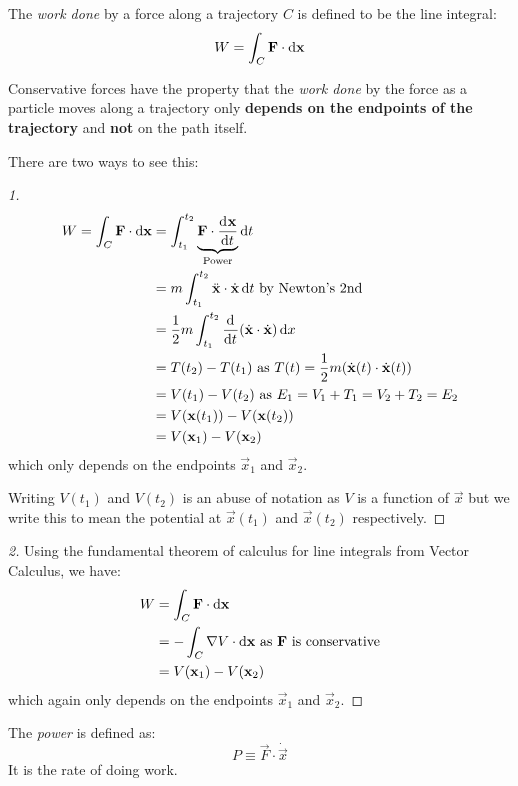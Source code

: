\documentclass[../main.tex]{subfiles}
\begin{document}
\begin{definition}
  The \textit{work done} by a force along a trajectory $C$ is defined to be the line integral:
  \[
    W = \int_C \vec{F} \cdot \d{\vec{x}}
  \]
\end{definition}
\begin{proposition}
  Conservative forces have the property that the \textit{work done} by the force as a particle moves along a trajectory only \textbf{depends on the endpoints of the trajectory} and \textbf{not} on the path itself.
\end{proposition}
There are two ways to see this:
\begin{proof}[1]
  \begin{align*}
    W = \int_C \vec{F} \cdot \d{\vec{x}} &= \int_{t_1}^{t_2} \underbrace{\vec{F} \cdot \deriv{\vec{x}}{t}}_{\text{Power}} \d{t} \\
                                         &= m \int_{t_1}^{t_2} \ddot{\vec{x}} \cdot \dot{\vec{x}} \d{t} \text{ by Newton's 2nd} \\
                                         &= \frac{1}{2}m \int_{t_1}^{t_2} \deriv{}{t}(\dot{\vec{x}} \cdot \dot{\vec{x}}) \d{x} \\
                                         &= T(t_2) - T(t_1) \text{ as $T(t) = \frac{1}{2} m (\dot{\vec{x}}(t) \cdot \dot{\vec{x}}(t))$}\\
                                         &= V(t_1) - V(t_2) \text{ as $E_1 = V_1 + T_1 = V_2 + T_2 = E_2$}\\
                                         &= V(\vec{x}(t_1)) - V(\vec{x}(t_2)) \\
                                         &= V(\vec{x}_1) - V(\vec{x}_2)
  \end{align*}
  which only depends on the endpoints $\vec{x}_1$ and $\vec{x}_2$.

  Writing $V(t_1)$ and $V(t_2)$ is an abuse of notation as $V$ is a function of $\vec{x}$ but we write this to mean the potential at $\vec{x}(t_1)$ and $\vec{x}(t_2)$ respectively.
\end{proof}
\begin{proof}[2]
  Using the fundamental theorem of calculus for line integrals from Vector Calculus, we have:
  \begin{align*}
    W &= \int_{C} \vec{F} \cdot \d{\vec{x}} \\
      &= - \int_{C} \nabla V \cdot \d{\vec{x}} \text{ as $\vec{F}$ is conservative} \\
      &= V(\vec{x}_1) - V(\vec{x}_2)
  \end{align*}
  which again only depends on the endpoints $\vec{x}_1$ and $\vec{x}_2$.
\end{proof}
\begin{definition}[Power]
  The \textit{power} is defined as: \label{powerDef}
  \[
    P \equiv \vec{F} \cdot \dot{\vec{x}}
  \]
  It is the rate of doing work.
\end{definition}
\end{document}
